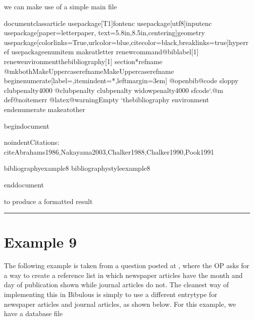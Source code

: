 \documentclass[letterpaper,10pt,english]{sphinxmanual}
\begin{document}
we can make use of a simple main  file

%
\begin{sphinxVerbatim}[commandchars=\\\{\}]
\PYGZbs{}documentclass\PYGZob{}article\PYGZcb{}
\PYGZbs{}usepackage[T1]\PYGZob{}fontenc\PYGZcb{}
\PYGZbs{}usepackage[utf8]\PYGZob{}inputenc\PYGZcb{}
\PYGZbs{}usepackage[paper=letterpaper, text=\PYGZob{}5.8in,8.5in\PYGZcb{},centering]\PYGZob{}geometry\PYGZcb{}
\PYGZbs{}usepackage[colorlinks=True,urlcolor=blue,citecolor=black,breaklinks=true]\PYGZob{}hyperref\PYGZcb{}
\PYGZbs{}usepackage\PYGZob{}enumitem\PYGZcb{}
\PYGZbs{}makeatletter
   \PYGZbs{}renewcommand\PYGZob{}\PYGZbs{}@biblabel\PYGZcb{}[1]\PYGZob{}\PYGZcb{}
   \PYGZbs{}renewenvironment\PYGZob{}thebibliography\PYGZcb{}[1]
      \PYGZob{}\PYGZbs{}section*\PYGZob{}\PYGZbs{}refname\PYGZcb{}\PYGZpc{}
         \PYGZbs{}@mkboth\PYGZob{}\PYGZbs{}MakeUppercase\PYGZbs{}refname\PYGZcb{}\PYGZob{}\PYGZbs{}MakeUppercase\PYGZbs{}refname\PYGZcb{}\PYGZpc{}
         \PYGZbs{}begin\PYGZob{}enumerate\PYGZcb{}[label=\PYGZob{}\PYGZcb{},itemindent=*,leftmargin=3em]
         \PYGZbs{}@openbib@code
         \PYGZbs{}sloppy
         \PYGZbs{}clubpenalty4000
         \PYGZbs{}@clubpenalty \PYGZbs{}clubpenalty
         \PYGZbs{}widowpenalty4000
         \PYGZbs{}sfcode{}`\PYGZbs{}.\PYGZbs{}@m\PYGZcb{}
         \PYGZob{}\PYGZbs{}def\PYGZbs{}@noitemerr
            \PYGZob{}\PYGZbs{}@latex@warning\PYGZob{}Empty {}`thebibliography\PYGZsq{} environment\PYGZcb{}\PYGZcb{}\PYGZpc{}
      \PYGZbs{}end\PYGZob{}enumerate\PYGZcb{}\PYGZcb{}
\PYGZbs{}makeatother

\PYGZbs{}begin\PYGZob{}document\PYGZcb{}

\PYGZob{}\PYGZbs{}noindent\PYGZcb{}Citations: \PYGZbs{}cite\PYGZob{}Abrahams1986,Nakayama2003,Chalker1988,Chalker1990,Pook1991\PYGZcb{}

\PYGZbs{}bibliography\PYGZob{}example8\PYGZcb{}
\PYGZbs{}bibliographystyle\PYGZob{}example8\PYGZcb{}

\PYGZbs{}end\PYGZob{}document\PYGZcb{}

\end{sphinxVerbatim}

to produce a formatted result

\noindent{}


\bigskip\hrule\bigskip



\section{Example 9}
\label{\detokenize{examples:example-9}}
The following example is taken from a question posted at , where the OP asks for a way to create a reference list in which newspaper articles have the month and day of publication shown while journal articles do not. The cleanest way of implementing this in Bibulous is simply to use a different entrytype for newspaper articles and journal articles, as shown below. For this example, we have a database file
\end{document}
